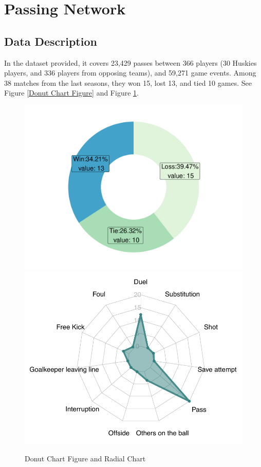 \documentclass{mcmthesis}
\begin{document}
\section{Passing Network}
\subsection{Data Description}
In the dataset provided, it covers 23,429 passes between 366 players (30 Huskies players, and 336 players from opposing teams), and 59,271 game events. Among 38 matches from the last seasons, they won 15, lost 13, and tied 10 games. See Figure \ref{Donut Chart Figure} and Figure \ref{Radial Chart}.\\

\begin{figure}[h!]
\begin{center}
\includegraphics[scale=0.4]{F1_1.pdf}
\includegraphics[scale=0.55]{F1_2fixed.pdf}
\caption{Donut Chart Figure and Radial Chart}\label{Radial Chart}
\end{center}
\end{figure}
\end{document}
